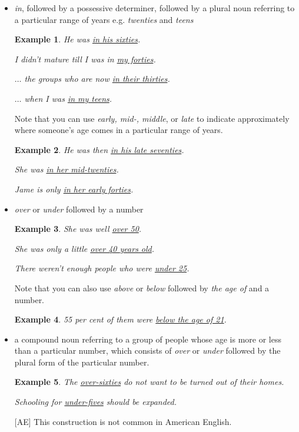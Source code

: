 \documentclass[oneside]{book}
\numberwithin{equation}{section}
\newtheorem{example}{Example}[section]
\begin{document}
\begin{itemize}
    \item \textit{in}, followed by a possessive determiner, followed by a plural noun referring to a particular range of years e.g. \textit{twenties} and \textit{teens}
    \begin{example}
        He was \underline{in his sixties}.
        
        I didn't mature till I was in \underline{my forties}.
        
        $\ldots$ the groups who are now \underline{in their thirties}.
        
        $\ldots$ when I was \underline{in my teens}.
    \end{example}
    Note that you can use \textit{early, mid-, middle}, or \textit{late} to indicate approximately where someone's age comes in a particular range of years.
    \begin{example}
        He was then \underline{in his late seventies}.
        
        She was \underline{in her mid-twenties}.
        
        Jame is only \underline{in her early forties}.
    \end{example}
    \item \textit{over} or \textit{under} followed by a number
    \begin{example}
        She was well \underline{over 50}.
        
        She was only a little \underline{over 40 years old}.
        
        There weren't enough people who were \underline{under 25}.
    \end{example}
    Note that you can also use \textit{above} or \textit{below} followed by \textit{the age of} and a number.
    \begin{example}
        55 per cent of them were \underline{below the age of 21}.
    \end{example}
    \item a compound noun referring to a group of people whose age is more or less than a particular number, which consists of \textit{over} or \textit{under} followed by the plural form of the particular number.
    \begin{example}
        The \underline{over-sixties} do not want to be turned out of their homes.
        
        Schooling for \underline{under-fives} should be expanded.
    \end{example}
    [AE] This construction is not common in American English.
\end{itemize}
\end{document}
